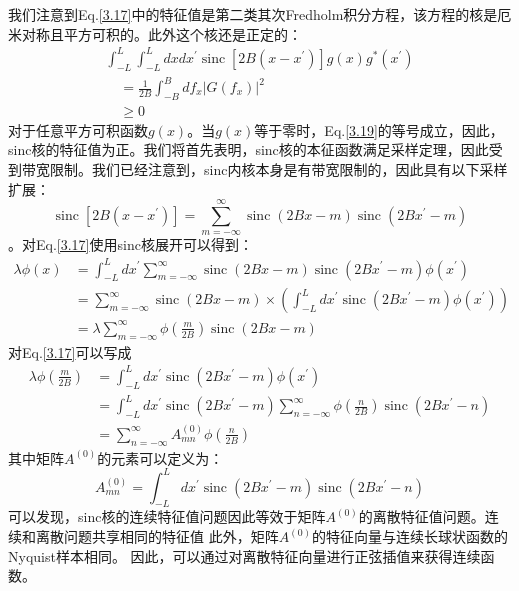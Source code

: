 \documentclass[10pt, UTF8]{ctexart}%
\newcommand{\InsertEqution}[2]{\begin{equation}
  \label{#1}
   #2
 \end{equation}}
\newcommand{\RefEq}[1]{Eq.\ref{#1}}
\newcommand{\InsertInlineEq}[1]{$#1$}
\begin{document}
\begin{sloppypar}
我们注意到\RefEq{3.17}中的特征值是第二类其次Fredholm积分方程，该方程的核是厄米对称且平方可积的。此外这个核还是正定的：\InsertEqution{3.19}{\begin{array}{l}
  \int_{-L}^{L} \int_{-L}^{L} d x d x^{\prime} \operatorname{sinc}\left[2 B\left(x-x^{\prime}\right)\right] g(x) g^{*}\left(x^{\prime}\right) \\
  \quad=\frac{1}{2 B} \int_{-B}^{B} d f_{x}\left|G\left(f_{x}\right)\right|^{2} \\
  \quad \geq 0
  \end{array}}
  对于任意平方可积函数\InsertInlineEq{g(x)}。当\InsertInlineEq{g(x)}等于零时，\RefEq{3.19}的等号成立，因此，sinc核的特征值为正。我们将首先表明，sinc核的本征函数满足采样定理，因此受到带宽限制。我们已经注意到，sinc内核本身是有带宽限制的，因此具有以下采样扩展：
  \InsertEqution{3.20}{\operatorname{sinc}\left[2 B\left(x-x^{\prime}\right)\right]=\sum_{m=-\infty}^{\infty} \operatorname{sinc}(2 B x-m) \operatorname{sinc}\left(2 B x^{\prime}-m\right)}。对\RefEq{3.17}使用sinc核展开可以得到：\InsertEqution{3.21}{\begin{aligned}
    \lambda \phi(x) &=\int_{-L}^{L} d x^{\prime} \sum_{m=-\infty}^{\infty} \operatorname{sinc}(2 B x-m) \operatorname{sinc}\left(2 B x^{\prime}-m\right) \phi\left(x^{\prime}\right) \\
    &=\sum_{m=-\infty}^{\infty}\operatorname{sinc}(2 B x-m)\times(\int_{-L}^{L} d x^{\prime} \operatorname{sinc}\left(2 B x^{\prime}-m\right) \phi\left(x^{\prime}\right))
    \\&=\lambda \sum_{m=-\infty}^{\infty} \phi\left(\frac{m}{2 B}\right) \operatorname{sinc}(2 B x-m)
    \end{aligned}}
  对\RefEq{3.17}可以写成\InsertEqution{3.22}{\begin{aligned}
    \lambda \phi\left(\frac{m}{2 B}\right) &=\int_{-L}^{L} d x^{\prime} \operatorname{sinc}\left(2 B x^{\prime}-m\right) \phi\left(x^{\prime}\right) \\
    &=\int_{-L}^{L} d x^{\prime} \operatorname{sinc}\left(2 B x^{\prime}-m\right) \sum_{n=-\infty}^{\infty} \phi\left(\frac{n}{2 B}\right) \operatorname{sinc}\left(2 B x^{\prime}-n\right) \\
    &=\sum_{n=-\infty}^{\infty} A_{m n}^{(0)} \phi\left(\frac{n}{2 B}\right)
    \end{aligned}}
  其中矩阵\InsertInlineEq{A^{(0)}}的元素可以定义为：\InsertEqution{3.23}{A_{m n}^{(0)}=\int_{-L}^{L} d x^{\prime} \operatorname{sinc}\left(2 B x^{\prime}-m\right) \operatorname{sinc}\left(2 B x^{\prime}-n\right)}
可以发现，sinc核的连续特征值问题因此等效于矩阵\InsertInlineEq{A^{(0)}}的离散特征值问题。连续和离散问题共享相同的特征值 此外，矩阵\InsertInlineEq{A^{(0)}}的特征向量与连续长球状函数的Nyquist样本相同。 因此，可以通过对离散特征向量进行正弦插值来获得连续函数。

\end{sloppypar}
\end{document}
